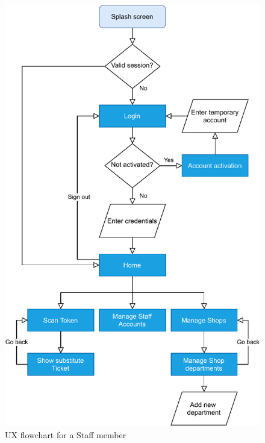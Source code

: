 \begin{figure}[H]
    \centering
    \includegraphics[height=0.85\textheight]{Images/ux-flowchart_staff.pdf}
    \caption{UX flowchart for a Staff member}
\end{figure}
